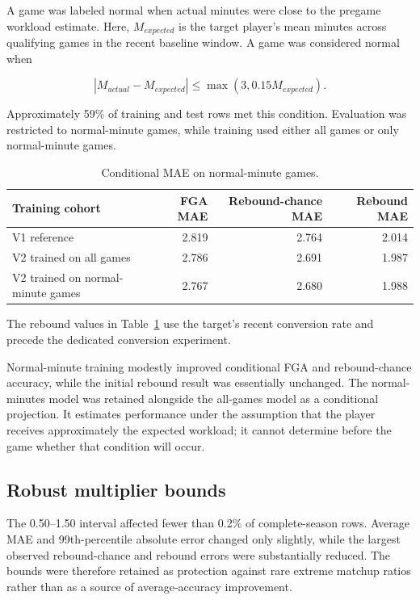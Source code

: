 \documentclass[11pt]{article}
\begin{document}
A game was labeled normal when actual minutes were close to the pregame
workload estimate. Here, $M_{expected}$ is the target player's mean minutes
across qualifying games in the recent baseline window. A game was considered
normal when

\[
|M_{actual}-M_{expected}|\leq
\max(3,0.15M_{expected}).
\]

Approximately 59\% of training and test rows met this condition. Evaluation
was restricted to normal-minute games, while training used either all games or
only normal-minute games.

\begin{table}[H]
\centering
\caption{Conditional MAE on normal-minute games.}
\label{tab:normal-minutes}
\small
\begin{tabular}{lrrr}
\toprule
Training cohort & FGA MAE & Rebound-chance MAE & Rebound MAE \\
\midrule
V1 reference & 2.819 & 2.764 & 2.014 \\
V2 trained on all games & 2.786 & 2.691 & 1.987 \\
V2 trained on normal-minute games & 2.767 & 2.680 & 1.988 \\
\bottomrule
\end{tabular}
\end{table}

The rebound values in Table~\ref{tab:normal-minutes} use the target's recent
conversion rate and precede the dedicated conversion experiment.

Normal-minute training modestly improved conditional FGA and rebound-chance
accuracy, while the initial rebound result was essentially unchanged. The normal-minutes model was retained alongside the all-games model as a
conditional projection. It estimates performance under the assumption that the player receives
approximately the expected workload; it cannot determine before the game
whether that condition will occur.

\subsection{Robust multiplier bounds}

The 0.50--1.50 interval affected fewer than 0.2\% of complete-season rows.
Average MAE and 99th-percentile absolute error changed only slightly, while the
largest observed rebound-chance and rebound errors were substantially reduced.
The bounds were therefore retained as protection against rare extreme matchup
ratios rather than as a source of average-accuracy improvement.
\end{document}

